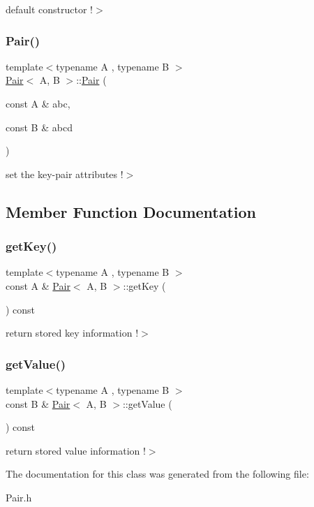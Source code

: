 default constructor !$>$ \mbox{\label{class_pair_aa26b7a4d230bcbabaa13b56a8f93c8a9}} 
\subsubsection{\texorpdfstring{Pair()}{Pair()}\hspace{0.1cm}{\footnotesize\ttfamily [2/2]}}
{\footnotesize\ttfamily template$<$typename A , typename B $>$ \\
\mbox{\hyperlink{class_pair}{Pair}}$<$ A, B $>$\+::\mbox{\hyperlink{class_pair}{Pair}} (\begin{DoxyParamCaption}\item[{const A \&}]{abc,  }\item[{const B \&}]{abcd }\end{DoxyParamCaption})}

set the key-\/pair attributes !$>$ 

\subsection{Member Function Documentation}
\mbox{\label{class_pair_a8bee912d3270c63944353caf2fa6330e}} 
\subsubsection{\texorpdfstring{get\+Key()}{getKey()}}
{\footnotesize\ttfamily template$<$typename A , typename B $>$ \\
const A \& \mbox{\hyperlink{class_pair}{Pair}}$<$ A, B $>$\+::get\+Key (\begin{DoxyParamCaption}{ }\end{DoxyParamCaption}) const}

return stored key information !$>$ \mbox{\label{class_pair_a6e1448bc216f86227f856a767f02e014}} 
\subsubsection{\texorpdfstring{get\+Value()}{getValue()}}
{\footnotesize\ttfamily template$<$typename A , typename B $>$ \\
const B \& \mbox{\hyperlink{class_pair}{Pair}}$<$ A, B $>$\+::get\+Value (\begin{DoxyParamCaption}{ }\end{DoxyParamCaption}) const}

return stored value information !$>$ 

The documentation for this class was generated from the following file\+:\begin{DoxyCompactItemize}
\item 
Pair.\+h\end{DoxyCompactItemize}
